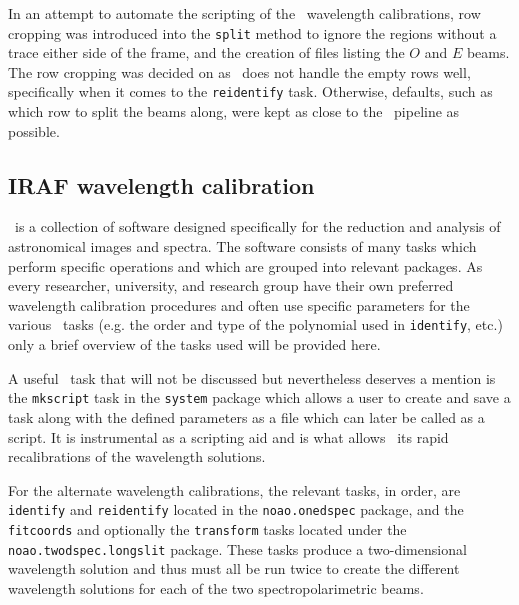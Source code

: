 In an attempt to automate the scripting of the \iraf\ wavelength calibrations, row cropping was introduced into the \texttt{split} method to ignore the regions without a trace either side of the frame, and the creation of files listing the $O$ and $E$ beams. The row cropping was decided on as \iraf\ does not handle the empty rows well, specifically when it comes to the \texttt{reidentify} task. Otherwise, defaults, such as which row to split the beams along, were kept as close to the \polsalt\ pipeline as possible.


\subsection{IRAF wavelength calibration}\label{subsec:IRAF_wav_cal}

\iraf\ is a collection of software designed specifically for the reduction and analysis of astronomical images and spectra. The software consists of many tasks which perform specific operations and which are grouped into relevant packages. As every researcher, university, and research group have their own preferred wavelength calibration procedures and often use specific parameters for the various \iraf\ tasks (e.g. the order and type of the polynomial used in \texttt{identify}, etc.) only a brief overview of the tasks used will be provided here.
\prgph

A useful \iraf\ task that will not be discussed but nevertheless deserves a mention is the \texttt{mkscript} task in the \texttt{system} package which allows a user to create and save a task along with the defined parameters as a file which can later be called as a script. It is instrumental as a scripting aid and is what allows \iraf\ its rapid recalibrations of the wavelength solutions.
\prgph

For the alternate wavelength calibrations, the relevant tasks, in order, are \texttt{identify} and \texttt{reidentify} located in the \texttt{noao.onedspec} package, and the \texttt{fitcoords} and optionally the \texttt{transform} tasks located under the \texttt{noao.twodspec.longslit} package. These tasks produce a two-dimensional wavelength solution and thus must all be run twice to create the different wavelength solutions for each of the two spectropolarimetric beams.

